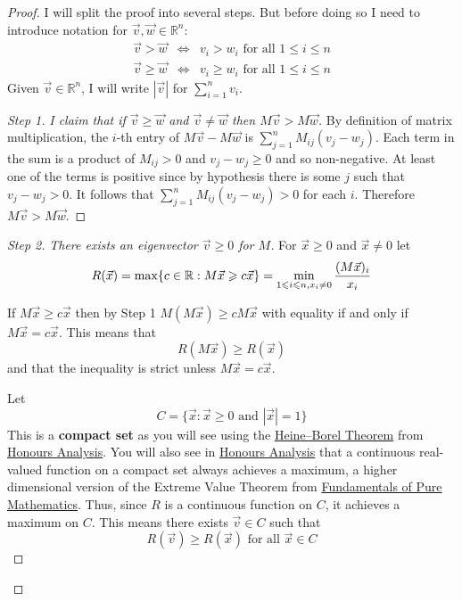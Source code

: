 \documentclass[11pt]{amsbook}
\theoremstyle{definition}
\begin{document}
\begin{proof} I will split the proof into several steps. But before doing so I need to introduce notation for $\vec{v}, \vec{w} \in \mathbb{R}^n$:
\begin{eqnarray*} \vec{v}> \vec{w} &\Leftrightarrow & v_i > w_i \text{ for all }1\leqslant i \leqslant n \\
 \vec{v}\geqslant \vec{w} &\Leftrightarrow & v_i \geqslant w_i \text{ for all }1\leqslant i \leqslant n \end{eqnarray*}
Given $\vec{v}\in \mathbb{R}^n$, I will write $|\vec{v}|$ for $\sum_{i=1}^n v_i$.

\begin{proof}[Step 1] {\it I claim that if $\vec{v} \geqslant \vec{w}$ and $\vec{v}\neq \vec{w}$ then $M\vec{v} > M\vec{w}$. }
By definition of matrix multiplication, the $i$-th entry of $M\vec{v} - M\vec{w}$ is $\sum_{j=1}^n M_{ij} (v_j - w_j)$. Each term in the sum is a product of $M_{ij}>0$ and $v_j-w_j \geqslant 0$ and so non-negative. At least one of the terms is positive since by hypothesis there is some $j$ such that $v_j-w_j >0$. It follows that  $\sum_{j=1}^n M_{ij} (v_j - w_j)>0$ for each $i$. Therefore $M\vec{v} > M\vec{w}$.
\end{proof}

\begin{proof}[Step 2] {\it There exists an eigenvector $\vec{v} \geqslant 0$ for $M$.}
For $\vec{x} \geqslant 0$ and $\vec{x} \neq 0$ let $$R(\vec{x}) = {\rm max}\{ c\in \mathbb{R} : M \vec{x} \geqslant c \vec{x} \}= \min_{1\leqslant i \leqslant n, x_i \neq 0} \frac{(M\vec{x})_i}{x_i}$$

If $ M\vec{x} \geqslant c \vec{x} $ then by Step 1 $M(M\vec{x}) \geqslant cM\vec{x}$ with equality if and only if $M\vec{x} = c \vec{x}$. This means that \begin{equation} \label{equsein} R(M\vec{x}) \geqslant R(\vec{x}) \end{equation} and that the inequality is strict unless $M\vec{x} = c\vec{x}$.

Let $$C = \{ \vec{x} : \vec{x} \geqslant 0 \text{ and } |\vec{x}| = 1 \}$$ This is a  {\bf compact set} as you will see using the \href{http://en.wikipedia.org/wiki/Heine-Borel_theorem}{Heine--Borel Theorem} from \href{http://www.drps.ed.ac.uk/14-15/dpt/cxmath10068.htm}{Honours Analysis}. You will also see in \href{http://www.drps.ed.ac.uk/14-15/dpt/cxmath10068.htm}{Honours Analysis} that a continuous real-valued function on a compact set always achieves a maximum, a higher dimensional version of the Extreme Value Theorem from \href{http://www.drps.ed.ac.uk/14-15/dpt/cxmath08064.htm}{Fundamentals of Pure Mathematics}. Thus, since $R$ is a continuous function on $C$, it achieves a maximum on $C$. This means there exists $\vec{v} \in C$ such that $$R(\vec{v}) \geqslant R(\vec{x}) \text{ for all }\vec{x} \in C$$


\end{proof}
\end{proof}
\end{document}
